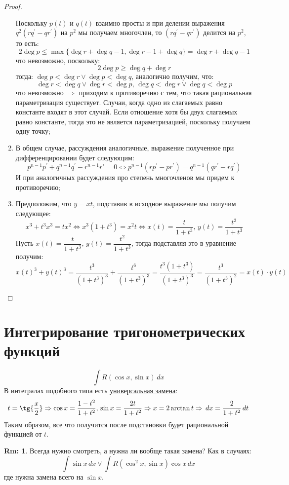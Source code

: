 \documentclass[12pt]{article}
\newcommand{\dx}{\, dx}
\newcommand{\dd}{\, d}
\theoremstyle{definition}
\newtheorem{rem}{Rm:}
\DeclareMathOperator{\dint}{\displaystyle\int}
\begin{document}
\begin{proof}
\begin{enumerate}[label={(\alph*)}]
		Поскольку $p(t)$ и $q(t)$ взаимно просты и при делении выражения $q^2 (rq^\prime - qr^\prime )$ на $p^2$ мы получаем многочлен, то $(rq^\prime - q r^\prime)$ делится на $p^2$, то есть:
		$$
			2\deg{p} \leq \max\{\deg{r} + \deg{q} - 1, \deg{r} - 1 + \deg{q}\} = \deg{r} + \deg{q} - 1
		$$
		что невозможно, поскольку:
		$$
			2\deg{p} \geq \deg{q} + \deg{r}
		$$ 
		тогда: $\deg{p} < \deg{r} \vee \deg{p} < \deg{q}$, аналогично получим, что: 
		$$
			\deg{r} < \deg{q} \vee \deg{r} < \deg{p}, \, \deg{q} < \deg{r} \vee \deg{q} < \deg{p}
		$$ 
		что невозможно $\Rightarrow$ приходим к противоречию с тем, что такая рациональная параметризация существует. Случаи, когда одно из слагаемых равно константе входят в этот случай. Если отношение хотя бы двух слагаемых равно константе, тогда это не является параметризацией, поскольку получаем одну точку;
		\item В общем случае, рассуждения аналогичные, выражение полученное при дифференцировании будет следующим:
		$$
			p^{n-1}p^\prime  + q^{n-1}q^\prime - r^{n-1}r\prime = 0 \Leftrightarrow p^{n-1}(rp^\prime - pr^\prime) = q^{n-1}(qr^\prime - rq^\prime)
		$$
		И при аналогичных рассуждения про степень многочленов мы придем к противоречию;
		
		\item Предположим, что $y = xt$, подставив в исходное выражение мы получим следующее:
		$$
			x^3 + t^3x^3 = tx^2 \Leftrightarrow x^3(1+t^3) = x^2 t \Leftrightarrow x(t) = \dfrac{t}{1+t^3}, \, y(t) = \dfrac{t^2}{1+t^3}
		$$
		Пусть $x(t) = \dfrac{t}{1 + t^3}, \, y(t) = \dfrac{t^2}{1+t^3}$, тогда подставляя это в уравнение получим:
		$$
			x(t)^3 + y(t)^3 = \dfrac{t^3}{(1+t^3)^3} + \dfrac{t^6}{(1+t^3)^3} = \dfrac{t^3(1+t^3)}{(1+t^3)^3} = \dfrac{t^3}{(1+t^3)^2} = x(t){\cdot}{y(t)}
		$$
	\end{enumerate}
\end{proof}

\section*{Интегрирование тригонометрических функций}
$$
	\dint R(\cos{x}, \sin{x}) \dd x
$$ 
В интегралах подобного типа есть \uline{универсальная замена}: 
$$t = \tg{\frac{x}{2}} \Rightarrow \cos{x} = \dfrac{1-t^2}{1+t^2},\, \sin{x} = \dfrac{2t}{1+t^2} \Rightarrow x = 2\arctan{t} \Rightarrow \dx = \dfrac{2}{1+t^2} \dd t$$
Таким образом, все что получится после подстановки будет рациональной функцией от $t$.
\begin{rem}
	Всегда нужно смотреть, а нужна ли вообще такая замена? Как в случаях: 
	$$
		\dint \sin{x} \dx \vee \dint R(\cos^2{x}, \sin{x})\cos{x} \dx
	$$
	где нужна замена всего на $\sin{x}$.
\end{rem}
\end{document}
